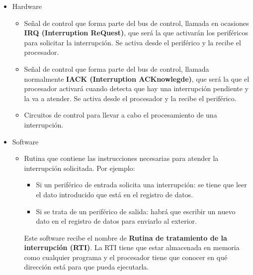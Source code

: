 \begin{itemize}
	\item Hardware
	
	\begin{itemize}
		\item Señal de control que forma parte del bus de control, llamada en ocasiones \textbf{IRQ (Interruption ReQuest)}, que será la que activarán los periféricos para solicitar la interrupción. Se activa desde el periférico y la recibe el procesador.
		\item Señal de control que forma parte del bus de control, llamada normalmente {\bf IACK (Interruption ACKnowlegde)}, que será la que el procesador activará cuando detecta que hay una interrupción pendiente y la va a atender. Se activa desde el procesador y la recibe el periférico. 
		\item Circuitos de control para llevar a cabo el procesamiento de una interrupción.
	\end{itemize}
	\item Software
	\begin{itemize}
		\item Rutina  que contiene las instrucciones necesarias para atender la interrupción solicitada. Por ejemplo:
		\begin{itemize}
			\item Si un periférico de entrada solicita una interrupción: se tiene que leer el dato introducido que está en el registro de datos.
			\item Si se trata de un periférico de salida: habrá que  escribir un nuevo  dato en el registro de datos para enviarlo al exterior.
		\end{itemize}
		Este software recibe el nombre de {\bf Rutina de tratamiento de la interrupción (RTI)}. La RTI tiene que estar almacenada en memoria como cualquier programa y el procesador tiene que conocer en qué dirección está para que pueda ejecutarla. 
	\end{itemize}
\end{itemize}

